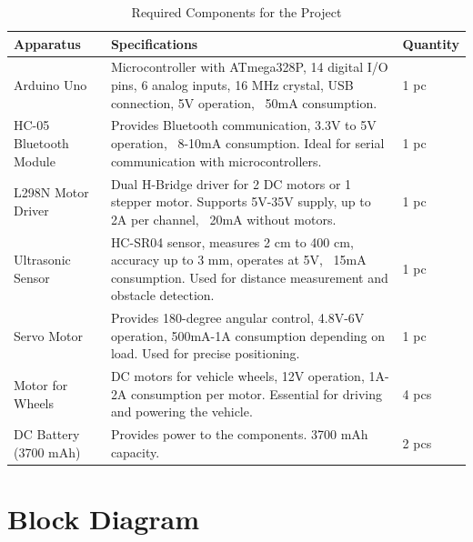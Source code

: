 \documentclass[12pt,a4paper]{report}
\begin{document}
\begin{table}[H]
\centering
\begin{tabular}{|p{5cm}|p{7cm}|p{2cm}|}
\hline
\textbf{Apparatus} & \textbf{Specifications} & \textbf{Quantity} \\
\hline
Arduino Uno & Microcontroller with ATmega328P, 14 digital I/O pins, 6 analog inputs, 16 MHz crystal, USB connection, 5V operation, ~50mA consumption. & 1 pc \\
\hline
HC-05 Bluetooth Module & Provides Bluetooth communication, 3.3V to 5V operation, ~8-10mA consumption. Ideal for serial communication with microcontrollers. & 1 pc \\
\hline
L298N Motor Driver & Dual H-Bridge driver for 2 DC motors or 1 stepper motor. Supports 5V-35V supply, up to 2A per channel, ~20mA without motors. & 1 pc \\
\hline
Ultrasonic Sensor & HC-SR04 sensor, measures 2 cm to 400 cm, accuracy up to 3 mm, operates at 5V, ~15mA consumption. Used for distance measurement and obstacle detection. & 1 pc \\
\hline
Servo Motor & Provides 180-degree angular control, 4.8V-6V operation, 500mA-1A consumption depending on load. Used for precise positioning. & 1 pc \\
\hline
Motor for Wheels & DC motors for vehicle wheels, 12V operation, 1A-2A consumption per motor. Essential for driving and powering the vehicle. & 4 pcs \\
\hline
DC Battery (3700 mAh) & Provides power to the components. 3700 mAh capacity. & 2 pcs \\
\hline
\end{tabular}
\caption{Required Components for the Project}
\end{table}

\chapter*{Block Diagram}
\end{document}
